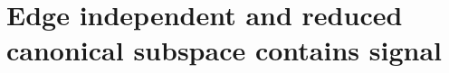 \documentclass{article}
\newcommand{\mD}{\mathcal{D}}
\newcommand{\mP}{\mathcal{P}}
\newcommand{\hm}{\widehat{m}}
\newcommand{\lam}{\lambda}
\newcommand{\Gam}{\Gamma}
\newcommand{\hlam}{\widehat{\lambda}}
\newcommand{\hth}{\widehat{\theta}}
\begin{document}
% 
% 






\section{Edge independent and reduced canonical subspace contains signal} %
\label{sub:edge_independent_and_reduced_subspace_contains_signal}
\end{document}
